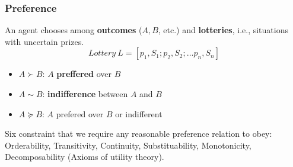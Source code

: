 \documentclass{scrartcl}
\begin{document}
\subsubsection{Preference}
An agent chooses among \textbf{outcomes} (\(A, B\), etc.) and \textbf{lotteries}, i.e., situations with uncertain prizes.
\[Lottery \ L = [p_1, S_1; p_2, S_2; \dots p_n, S_n]\]
\begin{itemize}
    \item
        \(A \succ B\): \(A\) \textbf{preffered} over \(B\)
    \item
        \(A \sim B\): \textbf{indifference} between \(A\) and \(B\)
    \item
        \(A \succeq B\): \(A\) prefered over \(B\) or indifferent
\end{itemize}
Six constraint that we require any reasonable preference relation to obey: Orderability, Transitivity, Continuity, Substituability, Monotonicity, Decomposability (Axioms of utility theory).
\end{document}
